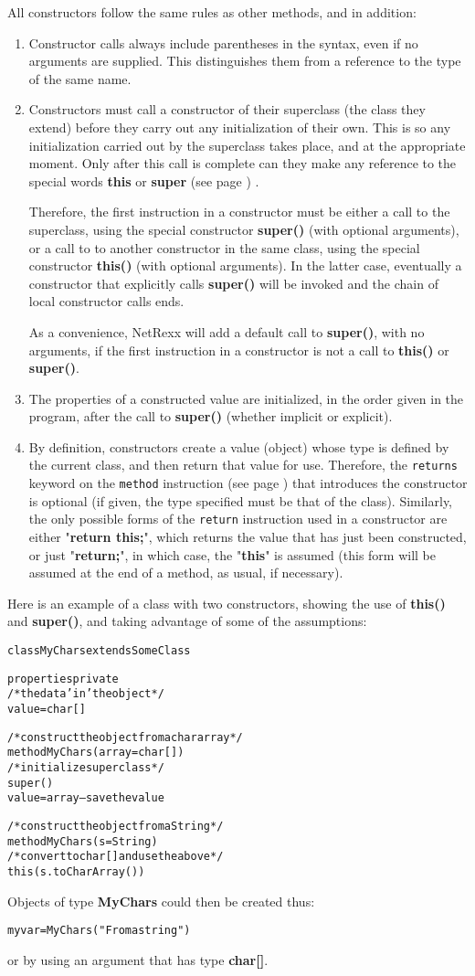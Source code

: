All constructors follow the same rules as other methods, and in
addition:
\begin{enumerate}
\item Constructor calls always include parentheses in the syntax, even
if no arguments are supplied.  This distinguishes them from a reference
to the type of the same name.
\item Constructors must call a constructor of their superclass (the class
they extend) before they carry out any initialization of their own.
This is so any initialization carried out by the superclass takes
place, and at the appropriate moment.
Only after this call is complete can they make any reference to the
special words  \textbf{this} or \textbf{super} (see page \pageref{refspecial}) .
 
Therefore, the first instruction in a constructor must be either a call
to the superclass, using the special constructor \textbf{super()}
(with optional arguments), or a call to to another constructor in the
same class, using the special constructor \textbf{this()} (with
optional arguments).
In the latter case, eventually a constructor that explicitly
calls \textbf{super()} will be invoked and the chain of local
constructor calls ends.
 
As a convenience, NetRexx will add a default call to \textbf{super()},
with no arguments, if the first instruction in a constructor is not a
call to \textbf{this()} or \textbf{super()}.
\item 
The properties of a constructed value are initialized, in the order
given in the program, after the call to \textbf{super()} (whether
implicit or explicit).
\item 
By definition, constructors create a value (object) whose type is
defined by the current class, and then return that value for use.
Therefore, the \texttt{returns} keyword on the
 \texttt{method} instruction (see page \pageref{refmethod})  that introduces the
constructor is optional (if given, the type specified must be that of
the class).
Similarly, the only possible forms of the \texttt{return} instruction
used in a constructor are either "\textbf{return this;}", which
returns the value that has just been constructed, or just
"\textbf{return;}", in which case, the "\textbf{this}" is
assumed (this form will be assumed at the end of a method, as usual, if
necessary).
\end{enumerate}
 
Here is an example of a class with two constructors, showing the use
of \textbf{this()} and \textbf{super()}, and taking advantage of
some of the assumptions:
\begin{alltt}
class MyChars extends SomeClass

  properties private
    /* the data 'in' the object */
    value=char[]

  /* construct the object from a char array */
  method MyChars(array=char[])
    /* initialize superclass */
    super()
    value=array             -- save the value

  /* construct the object from a String */
  method MyChars(s=String)
    /* convert to char[] and use the above */
    this(s.toCharArray())
\end{alltt}
 
Objects of type \textbf{MyChars} could then be created thus:
\begin{alltt}
myvar=MyChars("From a string")
\end{alltt}

or by using an argument that has type \textbf{char[]}.
